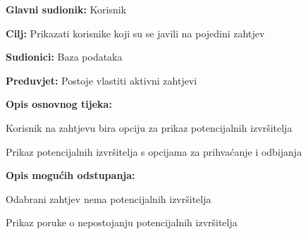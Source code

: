 			\noindent {}
			\begin{packed_item}
				
				\item \textbf{Glavni sudionik: }Korisnik
				\item  \textbf{Cilj:} Prikazati korisnike koji su se javili na pojedini zahtjev 
				\item  \textbf{Sudionici:} Baza podataka
				\item  \textbf{Preduvjet:} Postoje vlastiti aktivni zahtjevi
				\item  \textbf{Opis osnovnog tijeka:}
				
				\item[] \begin{packed_enum}
					
					\item Korisnik na zahtjevu bira opciju za prikaz potencijalnih izvršitelja
					\item Prikaz potencijalnih izvršitelja s opcijama za prihvaćanje i odbijanja
				\end{packed_enum}
				
				\item  \textbf{Opis mogućih odstupanja:}
				
				\item[] \begin{packed_item}
					
					\item[2.a] Odabrani zahtjev nema potencijalnih izvršitelja
					\item[] \begin{packed_enum}
						
						\item Prikaz poruke o nepostojanju potencijalnih izvršitelja
						
					\end{packed_enum}
					
				\end{packed_item}
			\end{packed_item}
		
